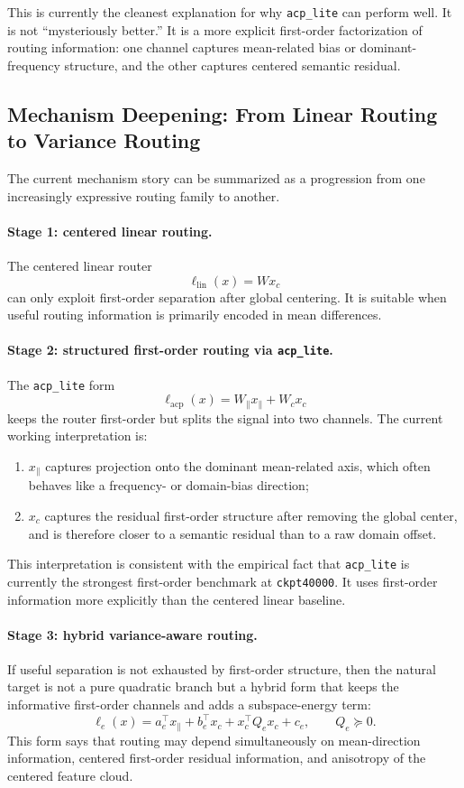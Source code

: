 \documentclass[11pt]{article}
\begin{document}
This is currently the cleanest explanation for why \texttt{acp\_lite} can perform well. It is not ``mysteriously better.'' It is a more explicit first-order factorization of routing information: one channel captures mean-related bias or dominant-frequency structure, and the other captures centered semantic residual.

\subsection{Mechanism Deepening: From Linear Routing to Variance Routing}

The current mechanism story can be summarized as a progression from one increasingly expressive routing family to another.

\paragraph{Stage 1: centered linear routing.}
The centered linear router
\[
\ell_{\mathrm{lin}}(x)=W x_c
\]
can only exploit first-order separation after global centering. It is suitable when useful routing information is primarily encoded in mean differences.

\paragraph{Stage 2: structured first-order routing via \texttt{acp\_lite}.}
The \texttt{acp\_lite} form
\[
\ell_{\mathrm{acp}}(x)=W_{\parallel}x_{\parallel}+W_c x_c
\]
keeps the router first-order but splits the signal into two channels. The current working interpretation is:
\begin{enumerate}
    \item $x_{\parallel}$ captures projection onto the dominant mean-related axis, which often behaves like a frequency- or domain-bias direction;
    \item $x_c$ captures the residual first-order structure after removing the global center, and is therefore closer to a semantic residual than to a raw domain offset.
\end{enumerate}

This interpretation is consistent with the empirical fact that \texttt{acp\_lite} is currently the strongest first-order benchmark at \texttt{ckpt40000}. It uses first-order information more explicitly than the centered linear baseline.

\paragraph{Stage 3: hybrid variance-aware routing.}
If useful separation is not exhausted by first-order structure, then the natural target is not a pure quadratic branch but a hybrid form that keeps the informative first-order channels and adds a subspace-energy term:
\[
\ell_e(x)
=
a_e^\top x_{\parallel}
+
b_e^\top x_c
+
x_c^\top Q_e x_c
+
c_e,
\qquad
Q_e \succeq 0.
\]
This form says that routing may depend simultaneously on mean-direction information, centered first-order residual information, and anisotropy of the centered feature cloud.
\end{document}
